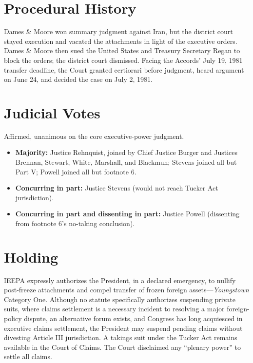 \documentclass[12pt]{article}
\begin{document}
\section{Procedural History}

Dames \& Moore won summary judgment against Iran, but the district court stayed execution and vacated the attachments in light of the executive orders. Dames \& Moore then sued the United States and Treasury Secretary Regan to block the orders; the district court dismissed. Facing the Accords' July 19, 1981 transfer deadline, the Court granted certiorari before judgment, heard argument on June 24, and decided the case on July 2, 1981.

\section{Judicial Votes}

Affirmed, unanimous on the core executive-power judgment.
\begin{itemize}
\item \textbf{Majority:} Justice Rehnquist, joined by Chief Justice Burger and Justices Brennan, Stewart, White, Marshall, and Blackmun; Stevens joined all but Part V; Powell joined all but footnote 6.
\item \textbf{Concurring in part:} Justice Stevens (would not reach Tucker Act jurisdiction).
\item \textbf{Concurring in part and dissenting in part:} Justice Powell (dissenting from footnote 6's no-taking conclusion).
\end{itemize}

\section{Holding}

IEEPA expressly authorizes the President, in a declared emergency, to nullify post-freeze attachments and compel transfer of frozen foreign assets---\textit{Youngstown} Category One. Although no statute specifically authorizes suspending private suits, where claims settlement is a necessary incident to resolving a major foreign-policy dispute, an alternative forum exists, and Congress has long acquiesced in executive claims settlement, the President may suspend pending claims without divesting Article III jurisdiction. A takings suit under the Tucker Act remains available in the Court of Claims. The Court disclaimed any ``plenary power'' to settle all claims.
\end{document}
